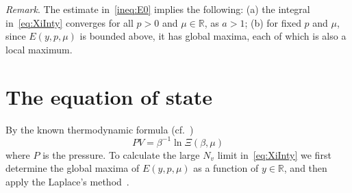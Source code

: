 \documentclass[12pt]{article}
\numberwithin{equation}{section}
\begin{document}
	\textit{Remark}. The estimate in~\eqref{ineq:E0} implies the following: (a) the integral in~\eqref{eq:XiInty} converges for all $p>0$ and $\mu \in \mathbb{R}$, as $a>1$; (b) for fixed $p$ and $\mu$, since $E(y,p,\mu)$ is bounded above, it has global maxima, each of which is also a local maximum.
	
	
	\section{The equation of state}
	By the known thermodynamic formula (cf.~\cite[(2.16)]{KKD20})
	\begin{equation}
		\label{def:eos}
		P V = \beta^{-1} \ln \Xi(\beta, \mu)
	\end{equation}
	where $P$ is the pressure. To calculate the large $N_v$ limit in~\eqref{eq:XiInty} we first determine the global maxima of $E(y,p,\mu)$ as a function of $y \in \mathbb{R}$, and then apply the Laplace's method~\cite{Fedoryuk89}.
	
\end{document}
